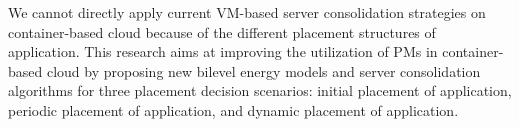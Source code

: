 We cannot directly apply current VM-based server consolidation strategies on container-based cloud because of the different placement structures of application. This research aims at improving the utilization of PMs in container-based cloud by proposing new bilevel energy models and server consolidation algorithms for three placement decision scenarios: initial placement of application, periodic placement of application, and dynamic placement of application.





\vspace{5mm}
